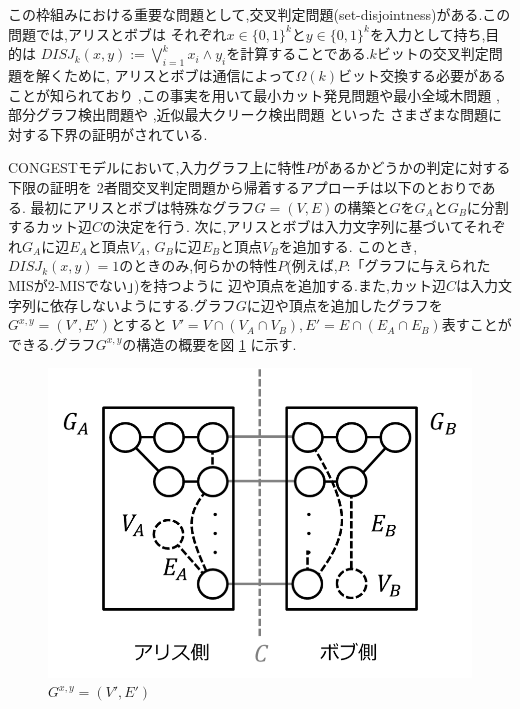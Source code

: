 \documentclass[12pt]{thesis}
\newcommand{\CONGEST}{\textsf{CONGEST}}
\theoremstyle{definition}
\begin{document}
この枠組みにおける重要な問題として,交叉判定問題(set-disjointness)がある.この問題では,アリスとボブは
それぞれ$x \in \{0, 1\}^{k}$と$y \in \{0, 1\}^{k}$を入力として持ち,目的は
$DISJ_{k} (x, y) :=\bigvee_{i = 1}^{k} x_{i} \land y_{i}$を計算することである.$k$ビットの交叉判定問題を解くために,
アリスとボブは通信によって$\Omega (k)$ビット交換する必要があることが知られており 
\cite{kalyanasundaram1992probabilistic},この事実を用いて最小カット発見問題や最小全域木問題 \cite{sarma2012distributed}, 
部分グラフ検出問題や \cite{fischer2018possibilities} ,近似最大クリーク検出問題 \cite{czumaj2020detecting} といった
さまざまな問題に対する下界の証明がされている.

{\CONGEST}モデルにおいて,入力グラフ上に特性$P$があるかどうかの判定に対する下限の証明を
2者間交叉判定問題から帰着するアプローチは以下のとおりである.
最初にアリスとボブは特殊なグラフ$G = (V, E)$の構築と$G$を$G_{A}$と$G_{B}$に分割するカット辺$C$の決定を行う.
次に,アリスとボブは入力文字列に基づいてそれぞれ$G_{A}$に辺$E_{A}$と頂点$V_{A}$,
$G_{B}$に辺$E_{B}$と頂点$V_{B}$を追加する.
このとき,$DISJ_{k} (x, y)=1$のときのみ,何らかの特性$P$(例えば,$P$:「グラフに与えられたMISが2-MISでない」)を持つように
辺や頂点を追加する.また,カット辺$C$は入力文字列に依存しないようにする.グラフ$G$に辺や頂点を追加したグラフを
$G^{x, y} = (V', E')$とすると
$V' = V \cap (V_{A} \cap V_{B}), E' = E \cap (E_{A} \cap E_{B})$表すことができる.グラフ$G^{x, y}$の構造の概要を図 \ref{Gxy} に示す.
\begin{figure}[ht]
\begin{center}
\includegraphics[width=120mm]{Gxy.png}
\end{center}
\caption{$G^{x, y} = (V', E')$}
\label{Gxy}
\end{figure}
\end{document}
